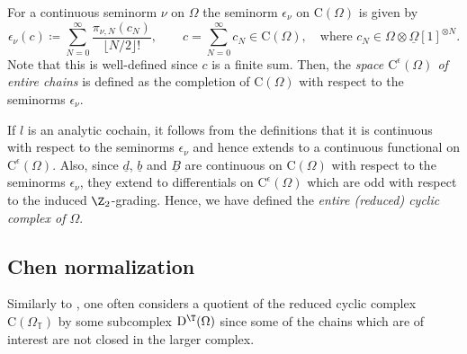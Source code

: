 \documentclass[a4paper, english, 12pt, bibliography=totocnumbered,
index=totoc]{scrartcl}
\begin{document}
\begin{defn}
	For a continuous seminorm $\nu$ on $\Omega$ the seminorm
	$\epsilon_\nu$ on $\mathrm{C}(\Omega)$ is given by
	\begin{equation}\label{Definition entire seminorm}
		\epsilon_{\nu}(c) \coloneqq \sum_{N = 0}^\infty \frac{\pi_{\nu,
				N}(c_N)}{\lfloor N/2 \rfloor!}, \qquad c = \sum_{N =
			0}^\infty c_N \in
		\mathrm{C}(\Omega), \quad \text{where $c_N \in \Omega \otimes
			\underline{\Omega}[1]^{\otimes N}$}.
	\end{equation}
	Note that this is well-defined since $c$ is a finite sum.
	Then, the \textit{space $\mathrm{C}^{\epsilon}(\Omega)$ of entire chains}
	is defined as the
	completion of $\mathrm{C}(\Omega)$ with respect to the seminorms
	$\epsilon_{\nu}$.
\end{defn}
If $l$ is an analytic cochain, it follows from the definitions that it is
continuous with respect to the seminorms $\epsilon_{\nu}$ and hence extends
to a continuous functional on $\mathrm{C}^\epsilon(\Omega)$.
Also, since $\underline{d}$, $\underline{b}$ and $\underline{B}$ are
continuous
on $\mathrm{C}(\Omega)$ with respect to the seminorms $\epsilon_\nu$, they
extend to differentials on $\mathrm{C}^\epsilon(\Omega)$ which are odd with
respect to the induced $\Z_2$-grading.
Hence, we have defined the \textit{entire (reduced) cyclic complex of
	$\Omega$}.
\subsection{Chen normalization}\label{Section: chen normalization}
Similarly to \cite{GetzlerJonesPetrack}, one often considers a quotient of the
reduced cyclic complex $\mathrm{C}(\Omega_{\mathbb{T}})$ by some subcomplex
$\mathrm{D}^\T(\Omega)$ since some of the chains which are of interest are
not closed in the larger complex.
\end{document}
